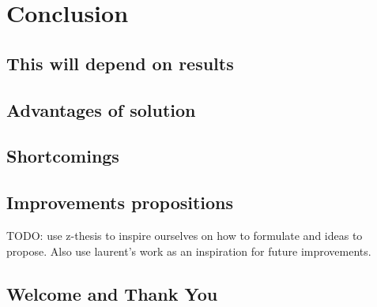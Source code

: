 
\chapter{Conclusion} %

\label{Conclusion} %

\section{This will depend on results}
\section{Advantages of solution}
\section{Shortcomings}
\section{Improvements propositions}
TODO: use z-thesis to inspire ourselves on how to formulate and ideas to propose.
Also use laurent's work as an inspiration for future improvements.
\section{Welcome and Thank You}
